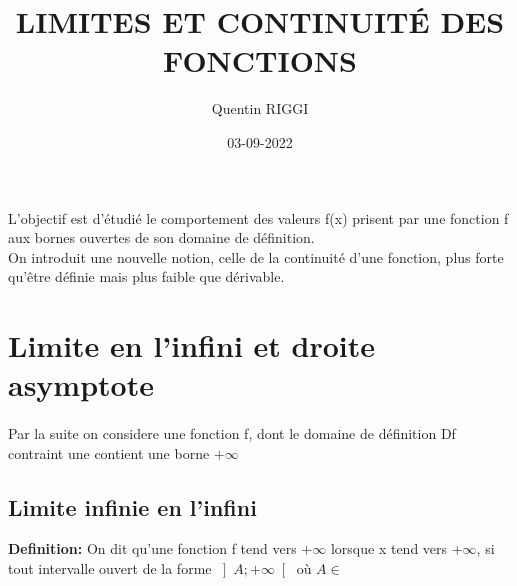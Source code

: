 \documentclass{article}
\title{\color{darkred}\Huge LIMITES ET CONTINUITÉ DES FONCTIONS}
\date{03-09-2022}
\author{Quentin RIGGI}
\renewcommand\large{\color{text}}
\begin{document}
	\maketitle
	\large L'objectif est d'étudié le comportement des valeurs f(x) prisent par une fonction f aux bornes ouvertes de son domaine de définition.\\
	\large On introduit une nouvelle notion, celle de la continuité d'une fonction, plus forte qu'être définie mais plus faible que dérivable.
	
	\section{Limite en l'infini et droite asymptote}
	\paragraph{} \large Par la suite on considere une fonction f, dont le domaine de définition Df contraint une contient une borne $+ \infty$ 

	\subsection{Limite infinie en l'infini}
	\textbf{\color{crimson}Definition:} On dit qu'une fonction f tend vers +$\infty$ lorsque x tend vers +$\infty$, si tout intervalle ouvert de la forme
	$\left]A; +\infty \right[$ où $A\in$
	
\end{document}
